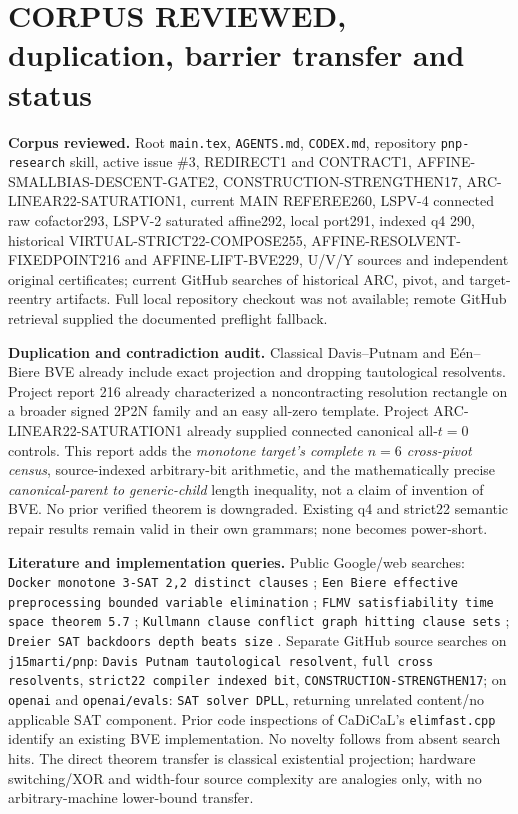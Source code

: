 \documentclass[10pt]{article}
\begin{document}
\section{CORPUS REVIEWED, duplication, barrier transfer and status}
\noindent\textbf{Corpus reviewed.} Root \texttt{main.tex}, \texttt{AGENTS.md}, \texttt{CODEX.md}, repository \texttt{pnp-research} skill, active issue \#3, REDIRECT1 and CONTRACT1, AFFINE-SMALLBIAS-DESCENT-GATE2, CONSTRUCTION-STRENGTHEN17, ARC-LINEAR22-SATURATION1, current MAIN REFEREE260, LSPV-4 connected raw cofactor293, LSPV-2 saturated affine292, local port291, indexed q4 290, historical VIRTUAL-STRICT22-COMPOSE255, AFFINE-RESOLVENT-FIXEDPOINT216 and AFFINE-LIFT-BVE229, U/V/Y sources and independent original certificates; current GitHub searches of historical ARC, pivot, and target-reentry artifacts. Full local repository checkout was not available; remote GitHub retrieval supplied the documented preflight fallback.

\noindent\textbf{Duplication and contradiction audit.} Classical Davis--Putnam and E\'en--Biere BVE already include exact projection and dropping tautological resolvents. Project report 216 already characterized a noncontracting resolution rectangle on a broader signed 2P2N family and an easy all-zero template. Project ARC-LINEAR22-SATURATION1 already supplied connected canonical all-$t=0$ controls. This report adds the \emph{monotone target's complete $n=6$ cross-pivot census}, source-indexed arbitrary-bit arithmetic, and the mathematically precise \emph{canonical-parent to generic-child} length inequality, not a claim of invention of BVE. No prior verified theorem is downgraded. Existing q4 and strict22 semantic repair results remain valid in their own grammars; none becomes power-short.

\noindent\textbf{Literature and implementation queries.} Public Google/web searches: \texttt{Docker monotone 3-SAT 2,2 distinct clauses} \cite{docker}; \texttt{Een Biere effective preprocessing bounded variable elimination} \cite{eenbiere}; \texttt{FLMV satisfiability time space theorem 5.7} \cite{flmv}; \texttt{Kullmann clause conflict graph hitting clause sets} \cite{kullmann}; \texttt{Dreier SAT backdoors depth beats size} \cite{backdoor}. Separate GitHub source searches on \texttt{j15marti/pnp}: \texttt{Davis Putnam tautological resolvent}, \texttt{full cross resolvents}, \texttt{strict22 compiler indexed bit}, \texttt{CONSTRUCTION-STRENGTHEN17}; on \texttt{openai} and \texttt{openai/evals}: \texttt{SAT solver DPLL}, returning unrelated content/no applicable SAT component. Prior code inspections of CaDiCaL's \texttt{elimfast.cpp} identify an existing BVE implementation. No novelty follows from absent search hits. The direct theorem transfer is classical existential projection; hardware switching/XOR and width-four source complexity are analogies only, with no arbitrary-machine lower-bound transfer.
\end{document}
